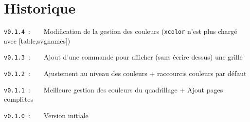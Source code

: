 \documentclass[a4paper]{article}
\begin{document}
\pagebreak

\section{Historique}

\verb|v0.1.4|~:~~~~Modification de la gestion des couleurs (\texttt{xcolor} n'est plus chargé avec \textsf{[table,svgnames]})

\verb|v0.1.3|~:~~~~Ajout d'une commande pour afficher (sans écrire dessus) une grille

\verb|v0.1.2|~:~~~~Ajustement au niveau des couleurs + raccourcis couleurs par défaut

\verb|v0.1.1|~:~~~~Meilleure gestion des couleurs du quadrillage + Ajout pages complètes

\verb|v0.1.0|~:~~~~Version initiale
\end{document}
